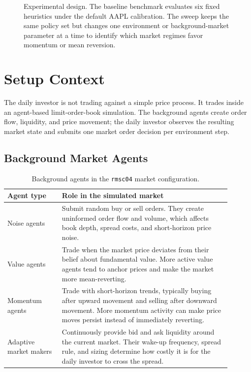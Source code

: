 \documentclass[11pt]{article}
\begin{document}
\begin{figure}[H]
{%
}
\caption{Experimental design. The baseline benchmark evaluates six fixed
heuristics under the default AAPL calibration. The sweep keeps the same policy
set but changes one environment or background-market parameter at a time to
identify which market regimes favor momentum or mean reversion.}
\label{fig:experiment-design}
\end{figure}

\section{Setup Context}

The daily investor is not trading against a simple price process. It trades
inside an agent-based limit-order-book simulation. The background agents create
order flow, liquidity, and price movement; the daily investor observes the
resulting market state and submits one market order decision per environment
step.

\subsection{Background Market Agents}

\begin{table}[H]
\centering
\small
\begin{tabular}{p{0.22\linewidth}p{0.68\linewidth}}
\toprule
Agent type & Role in the simulated market \\
\midrule
Noise agents &
Submit random buy or sell orders. They create uninformed order flow and volume,
which affects book depth, spread costs, and short-horizon price noise. \\
Value agents &
Trade when the market price deviates from their belief about fundamental value.
More active value agents tend to anchor prices and make the market more
mean-reverting. \\
Momentum agents &
Trade with short-horizon trends, typically buying after upward movement and
selling after downward movement. More momentum activity can make price moves
persist instead of immediately reverting. \\
Adaptive market makers &
Continuously provide bid and ask liquidity around the current market. Their
wake-up frequency, spread rule, and sizing determine how costly it is for the
daily investor to cross the spread. \\
\bottomrule
\end{tabular}
\caption{Background agents in the \texttt{rmsc04} market configuration.}
\label{tab:background-agents}
\end{table}
\end{document}
